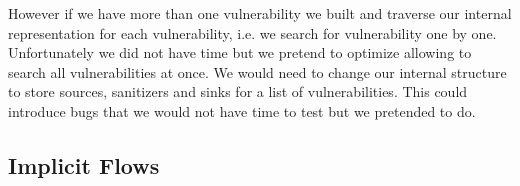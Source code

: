 However if we have more than one vulnerability we built and traverse our internal representation for each
vulnerability, i.e. we search for vulnerability one by one. Unfortunately we did not have time but we pretend
to optimize allowing to search all vulnerabilities at once. We would need to change our internal structure to store 
sources, sanitizers and sinks for a list of vulnerabilities. This could introduce bugs that we would not have
time to test but we pretended to do.

\subsection*{Implicit Flows}
